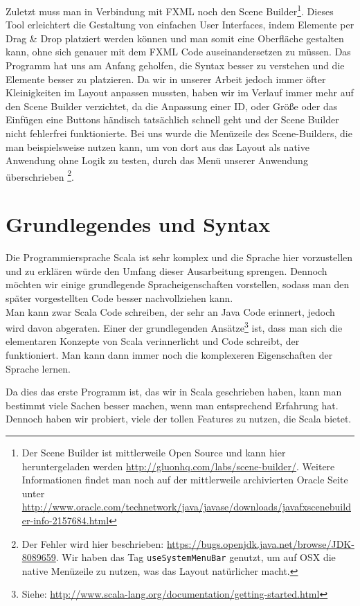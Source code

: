 Zuletzt muss man in Verbindung mit FXML noch den Scene Builder\footnote{Der Scene Builder ist mittlerweile Open Source und kann hier heruntergeladen werden \url{http://gluonhq.com/labs/scene-builder/}. Weitere Informationen findet man noch auf der mittlerweile archivierten Oracle Seite unter \url{http://www.oracle.com/technetwork/java/javase/downloads/javafxscenebuilder-info-2157684.html}}. Dieses Tool erleichtert die Gestaltung von einfachen User Interfaces, indem Elemente per Drag \& Drop platziert werden können und man somit eine Oberfläche gestalten kann, ohne sich genauer mit dem FXML Code auseinandersetzen zu müssen. Das Programm hat uns am Anfang geholfen, die Syntax besser zu verstehen und die Elemente besser zu platzieren. Da wir in unserer Arbeit jedoch immer öfter Kleinigkeiten im Layout anpassen mussten, haben wir im Verlauf immer mehr auf den Scene Builder verzichtet, da die Anpassung einer ID, oder Größe oder das Einfügen eine Buttons händisch tatsächlich schnell geht und der Scene Builder nicht fehlerfrei funktionierte. Bei uns wurde die Menüzeile des Scene-Builders, die man beispielsweise nutzen kann, um von dort aus das Layout als native Anwendung ohne Logik zu testen,  durch das Menü unserer Anwendung überschrieben \footnote{Der Fehler wird hier beschrieben: \url{https://bugs.openjdk.java.net/browse/JDK-8089659}. Wir haben das Tag \texttt{useSystemMenuBar} genutzt, um auf OSX die native Menüzeile zu nutzen, was das Layout natürlicher macht.}.

\section{Grundlegendes und Syntax}
Die Programmiersprache Scala ist sehr komplex und die Sprache hier vorzustellen und zu erklären würde den Umfang dieser Ausarbeitung sprengen. Dennoch möchten wir einige grundlegende Spracheigenschaften vorstellen, sodass man den später vorgestellten Code besser nachvollziehen kann.\\
Man kann zwar Scala Code schreiben, der sehr an Java Code erinnert, jedoch wird davon abgeraten. Einer der grundlegenden Ansätze\footnote{Siehe: \url{http://www.scala-lang.org/documentation/getting-started.html}} ist, dass man sich die elementaren Konzepte von Scala verinnerlicht und Code schreibt, der funktioniert. Man kann dann immer noch die komplexeren Eigenschaften der Sprache lernen.

Da dies das erste Programm ist, das wir in Scala geschrieben haben, kann man bestimmt viele Sachen besser machen, wenn man entsprechend Erfahrung hat. Dennoch haben wir probiert, viele der tollen Features zu nutzen, die Scala bietet.


